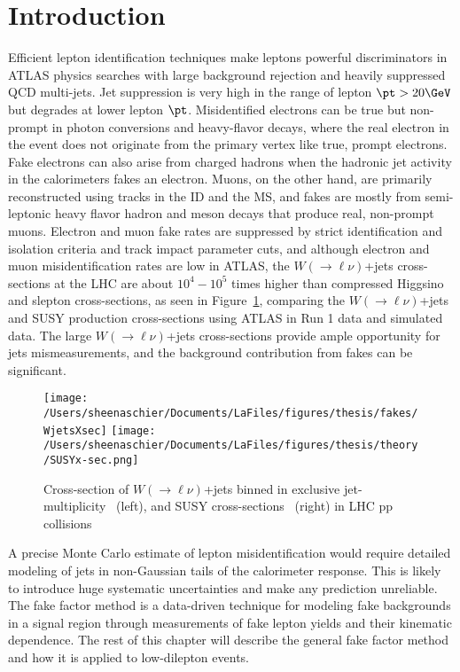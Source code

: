 \section{Introduction}
\label{sec:FFintro}
Efficient lepton identification techniques make leptons powerful discriminators in ATLAS physics searches with large background rejection and heavily suppressed QCD multi-jets.  Jet suppression is very high in the range of lepton $\pt > 20\GeV$ but degrades at lower lepton $\pt$.  Misidentified electrons can be true but non-prompt in photon conversions and heavy-flavor decays, where the real electron in the event does not originate from the primary vertex like true, prompt electrons.  Fake electrons can also arise from charged hadrons when the hadronic jet activity in the calorimeters fakes an electron.  Muons, on the other hand, are primarily reconstructed using tracks in the ID and the MS, and fakes are mostly from semi-leptonic heavy flavor hadron and meson decays that produce real, non-prompt muons. Electron and muon fake rates are suppressed by strict identification and isolation criteria and track impact parameter cuts, and although electron and muon misidentification rates are low in ATLAS, the $W(\rightarrow\ell\nu)$+jets cross-sections at the LHC are about $10^4-10^5$ times higher than compressed Higgsino and slepton cross-sections, as seen in Figure~\ref{fig:fake:xsec}, comparing the $W(\rightarrow\ell\nu)$+jets and SUSY production cross-sections using ATLAS in Run 1 data and simulated data.  The large $W(\rightarrow\ell\nu)$+jets cross-sections provide ample opportunity for jets mismeasurements, and the background contribution from fakes can be significant.    
\begin{figure}[h!]
 \centering
 \texttt{[image: /Users/sheenaschier/Documents/LaFiles/figures/thesis/fakes/WjetsXsec]}
  \texttt{[image: /Users/sheenaschier/Documents/LaFiles/figures/thesis/theory/SUSYx-sec.png]}
 \caption{Cross-section of $W(\rightarrow\ell\nu)$+jets binned in exclusive jet-multiplicity~\cite{ad:2014qxa} (left), and SUSY cross-sections~\cite{Bechtle:2015nta} (right) in LHC pp collisions}
 \label{fig:fake:xsec}
 \end{figure}
A precise Monte Carlo estimate of lepton misidentification would require detailed modeling of jets in non-Gaussian tails of the calorimeter response.  This is likely to introduce huge systematic uncertainties and make any prediction unreliable.  The fake factor method is a data-driven technique for modeling fake backgrounds in a signal region through measurements of fake lepton yields and their kinematic dependence.  The rest of this chapter will describe the general fake factor method and how it is applied to low-\pt dilepton events. 

